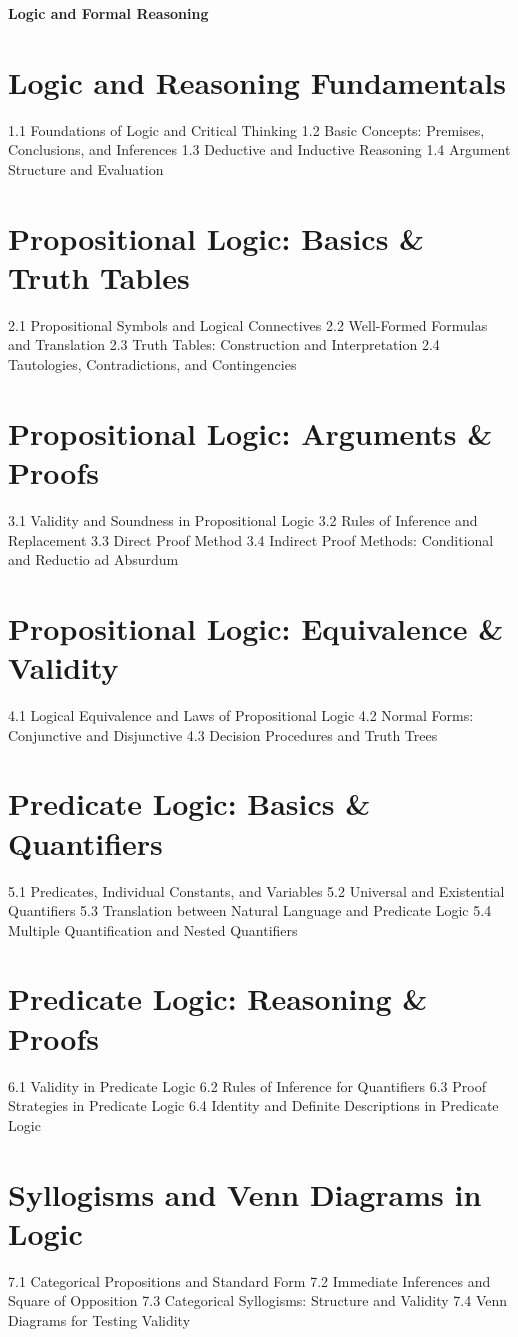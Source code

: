 {\LARGE \bf{Logic and Formal Reasoning}}
\section{Logic and Reasoning Fundamentals}
1.1 Foundations of Logic and Critical Thinking
1.2 Basic Concepts: Premises, Conclusions, and Inferences
1.3 Deductive and Inductive Reasoning
1.4 Argument Structure and Evaluation
\section{Propositional Logic: Basics \& Truth Tables}
2.1 Propositional Symbols and Logical Connectives
2.2 Well-Formed Formulas and Translation
2.3 Truth Tables: Construction and Interpretation
2.4 Tautologies, Contradictions, and Contingencies
\section{Propositional Logic: Arguments \& Proofs}
3.1 Validity and Soundness in Propositional Logic
3.2 Rules of Inference and Replacement
3.3 Direct Proof Method
3.4 Indirect Proof Methods: Conditional and Reductio ad Absurdum
\section{Propositional Logic: Equivalence \& Validity}
4.1 Logical Equivalence and Laws of Propositional Logic
4.2 Normal Forms: Conjunctive and Disjunctive
4.3 Decision Procedures and Truth Trees
\section{Predicate Logic: Basics \& Quantifiers}
5.1 Predicates, Individual Constants, and Variables
5.2 Universal and Existential Quantifiers
5.3 Translation between Natural Language and Predicate Logic
5.4 Multiple Quantification and Nested Quantifiers
\section{Predicate Logic: Reasoning \& Proofs}
6.1 Validity in Predicate Logic
6.2 Rules of Inference for Quantifiers
6.3 Proof Strategies in Predicate Logic
6.4 Identity and Definite Descriptions in Predicate Logic
\section{Syllogisms and Venn Diagrams in Logic}
7.1 Categorical Propositions and Standard Form
7.2 Immediate Inferences and Square of Opposition
7.3 Categorical Syllogisms: Structure and Validity
7.4 Venn Diagrams for Testing Validity
